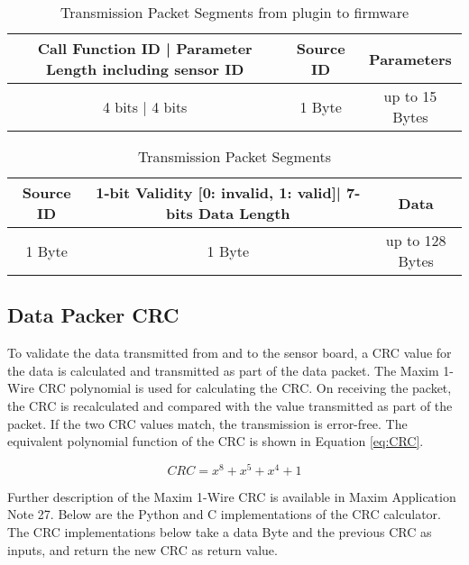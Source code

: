 \begin{table}[H]
    \centering
    {
    \begin{tabular}{|c|c|c|}
        \hline
        \rowcolor{black!8}
        \textbf{Call Function ID | Parameter Length including sensor ID} & \bf{Source ID} & \textbf{Parameters} \\ \hline
        4 bits | 4 bits & 1 Byte & up to 15 Bytes \\
        \hline
    \end{tabular}
    }
    \caption{Transmission Packet Segments from plugin to firmware}
    \label{table:toFW}
\end{table}


\begin{table}[H]
    \centering
    {
    \begin{tabular}{|c|c|c|}
        \hline
        \rowcolor{black!8}
        \textbf{Source ID} & \bf{1-bit Validity [0: invalid, 1: valid]| 7-bits Data Length} & \textbf{Data} \\ \hline
        1 Byte & 1 Byte & up to 128 Bytes \\
        \hline
    \end{tabular}
    }
    \caption{Transmission Packet Segments}
    \label{table:toPlugin}
\end{table}



\subsection{Data Packer CRC} \label{ssec:crc-calc}

To validate the data transmitted from and to the sensor board, a CRC value for the data is
calculated and transmitted as part of the data packet. The Maxim 1-Wire
CRC polynomial is used for calculating the CRC.  On receiving the packet, the CRC is recalculated and compared with the value transmitted as part of
the packet. If the two CRC values match, the transmission is error-free.
The equivalent polynomial function of the CRC is shown in Equation \ref{eq:CRC}.

\begin{equation}
\label{eq:CRC}
CRC = x^8 + x^5 + x^4 + 1
\end{equation}

Further description of the Maxim 1-Wire CRC is available in Maxim Application Note 27. Below are
the Python and C implementations of the CRC calculator. The CRC implementations below take a
data Byte and the previous CRC as inputs, and return the new CRC as return value.
\\

